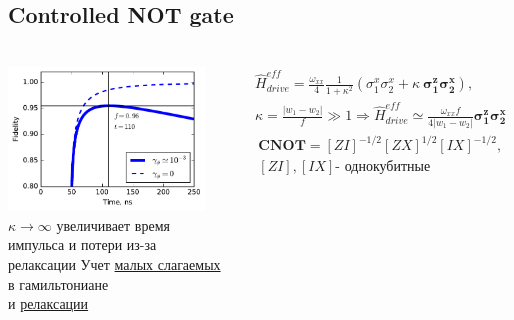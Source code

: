 \documentclass[aspectratio=169, 13pt]{beamer}
\begin{document}
\subsection{Controlled NOT gate}
\begin{frame}[c]\frametitle{\secname}\framesubtitle{\subsecname}
\begin{columns}[c]

\includegraphics[width = 0.9\textwidth]{CNOT_fidelity_time}
\vspace{0.1cm}
$\kappa \rightarrow \infty$ увеличивает время импульса и потери из-за релаксации
Учет \underline{малых слагаемых} в гамильтониане \\  и \underline{релаксации}

\begin{gather*}
\hat{H}^{eff}_{drive} = 
\frac{\omega_{xx}}{4} \frac{1}{1 + \kappa^2}  \left( \sigma^x_1 \sigma^x_2 + \kappa ~\mathbf{\sigma^z_1 \sigma^x_2} \right) , \\
\kappa = \frac{\left|w_1 - w_2 \right|}{f} \gg 1 \Rightarrow
\hat{H}^{eff}_{drive} \simeq
\frac{\omega_{xx} f}{4 \left|w_1 - w_2 \right|} \mathbf{\sigma^z_1 \sigma^x_2}
\end{gather*}
\begin{gather*}
\mathbf{CNOT} = \left[ ZI \right] ^{-1/2} \left[ ZX \right]^{1/2} \left[ IX \right]^{-1/2},\\
\left[ ZI \right], \left[ IX \right] \text{- однокубитные}
\end{gather*}

\end{columns}

\end{frame}
\end{document}
